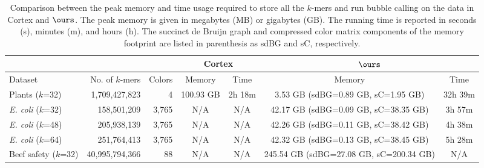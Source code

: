 \begin{sidewaystable}%
  \small
  \centering
  \begin{tabular}{| l | r | r | c | c | c |c |}
   	\hline
	\multicolumn{1}{|l}{}
   	& \multicolumn{1}{r}{}	
	& \multicolumn{1}{r}{} 
	& \multicolumn{2}{|c|}{{\sc Cortex}} 
	& \multicolumn{2}{|c|}{$\ours$}  \\
	\hline
	 Dataset & No. of $k$-mers & Colors & Memory & Time & Memory & Time \\
	\hline
	Plants	($k$=32)				& 1,709,427,823 	& 4 	& 100.93 GB 	& 2h 18m	& 3.53 GB (sdBG=0.89 GB, sC=1.95 GB) 	& 32h 39m \\
     \emph{E. coli}  ($k$=32)         & 158,501,209       & 3,765 & N/A        & N/A      &  42.17 GB (sdBG=0.09 GB, sC=38.35 GB)     & 3h 57m  \\
     \emph{E. coli}  ($k$=48)         & 205,938,139       & 3,765 & N/A        & N/A      &  42.26 GB (sdBG=0.11 GB, sC=38.42 GB)     & 4h 38m  \\
     \emph{E. coli}  ($k$=64)         & 251,764,413       & 3,765 & N/A        & N/A      &  42.32 GB (sdBG=0.13 GB, sC=38.45 GB)     & 5h 28m  \\
    Beef safety ($k$=32)                            & 40,995,794,366    & 88    & N/A        & N/A   & 245.54 GB (sdBG=27.08 GB, sC=200.34 GB)     & N/A \\
 	\hline
	\end{tabular}
  \caption{Comparison between the peak memory and time usage required to store all the $k$-mers and run bubble calling on the data in {\sc Cortex} and $\ours$.
    The peak memory is given in megabytes (MB) or gigabytes (GB). The running time is reported in seconds (s), minutes (m), and hours (h).  The succinct de Bruijn graph and compressed color matrix components of the memory footprint are listed in parenthesis as sdBG and sC, respectively.}
 \label{tbl-cosmo}
\end{sidewaystable}


\subsection{}

